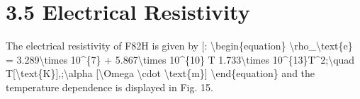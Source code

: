 \documentclass[letterpaper,10pt,english]{jupyterBook}
\begin{document}
	
	\section{3.5 Electrical Resistivity}
	\label{\detokenize{3 Thermophysical Properties:electrical-resistivity}}
	\sphinxAtStartPar
	The electrical resistivity of F82H is given by {[}\sphinxhref{https://drive.google.com/file/d/1EAKnctMi6BqWtE4DrxCDe5L8niCH0WDe/view?usp=drive\_link}{TavassoliRensman2002}{]}:
	\textbackslash{}begin\{equation\}
	\textbackslash{}rho\_\textbackslash{}text\{e\} = 3.289\textbackslash{}times 10\textasciicircum{}\{\sphinxhyphen{}7\} + 5.867\textbackslash{}times 10\textasciicircum{}\{\sphinxhyphen{}10\} T \sphinxhyphen{} 1.733\textbackslash{}times 10\textasciicircum{}\{\sphinxhyphen{}13\}T\textasciicircum{}2;\textbackslash{}quad T{[}\textbackslash{}text\{K\}{]},;\textbackslash{}alpha {[}\textbackslash{}Omega \textbackslash{}cdot \textbackslash{}text\{m\}{]}
	\textbackslash{}end\{equation\}
	and the temperature dependence is displayed in Fig. 15.
	
\end{document}
